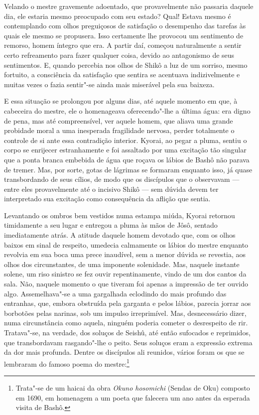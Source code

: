 Velando o mestre gravemente adoentado, que provavelmente não passaria
daquele dia, ele estaria mesmo preocupado com seu estado? Qual! Estava
mesmo é contemplando com olhos preguiçosos de satisfação o desempenho
das tarefas às quais ele mesmo se propusera. Isso certamente lhe
provocou um sentimento de remorso, homem íntegro que era. A partir daí,
começou naturalmente a sentir certo refreamento para fazer qualquer
coisa, devido ao antagonismo de seus sentimentos. E, quando percebia
nos olhos de Shikô a luz de um sorriso, mesmo fortuito, a consciência
da satisfação que sentira se acentuava indizivelmente e muitas vezes o
fazia sentir"-se ainda mais miserável pela sua baixeza.

E essa situação se prolongou por alguns dias, até aquele momento em que,
à cabeceira do mestre, ele o homenageava oferecendo"-lhe a última água:
era digno de pena, mas até compreensível, ver aquele homem, que aliava
uma grande probidade moral a uma inesperada fragilidade nervosa, perder
totalmente o controle de si ante essa contradição interior. Kyorai, ao
pegar a pluma, sentiu o corpo se enrijecer estranhamente e foi
assaltado por uma excitação tão singular que a ponta branca embebida de
água que roçava os lábios de Bashô não parava de tremer. Mas, por
sorte, gotas de lágrimas se formaram enquanto isso, já quase
transbordando de seus cílios, de modo que os discípulos que o
observavam --- entre eles provavelmente até o incisivo Shikô --- sem dúvida
devem ter interpretado sua excitação como consequência da aflição que
sentia.

Levantando os ombros bem vestidos numa estampa miúda, Kyorai retornou
timidamente a seu lugar e entregou a pluma às mãos de Jôsô, sentado
imediatamente atrás. A atitude daquele homem devotado que, com os olhos
baixos em sinal de respeito, umedecia calmamente os lábios do mestre
enquanto revolvia em sua boca uma prece inaudível, sem a menor dúvida
se revestia, aos olhos dos circunstantes, de uma imponente solenidade.
Mas, naquele instante solene, um riso sinistro se fez ouvir
repentinamente, vindo de um dos cantos da sala. Não, naquele momento o
que tiveram foi apenas a impressão de ter ouvido algo. Assemelhava"-se a
uma gargalhada eclodindo do mais profundo das entranhas, que, embora
obstruída pela garganta e pelos lábios, parecia jorrar aos borbotões
pelas narinas, sob um impulso irreprimível. Mas, desnecessário dizer,
numa circunstância como aquela, ninguém poderia cometer o desrespeito
de rir. Tratava"-se, na verdade, dos soluços de Seishû, até então
sufocados e reprimidos, que transbordavam rasgando"-lhe o peito. Seus
soluços eram a expressão extrema da dor mais profunda. Dentre os
discípulos ali reunidos, vários foram os que se lembraram do famoso
poema do mestre:\footnote{ Trata"-se de um haicai da obra \textit{Okuno
hosomichi} (Sendas de Oku) composto em 1690, em homenagem a um poeta 
que falecera um ano antes da esperada visita de Bashô.}

